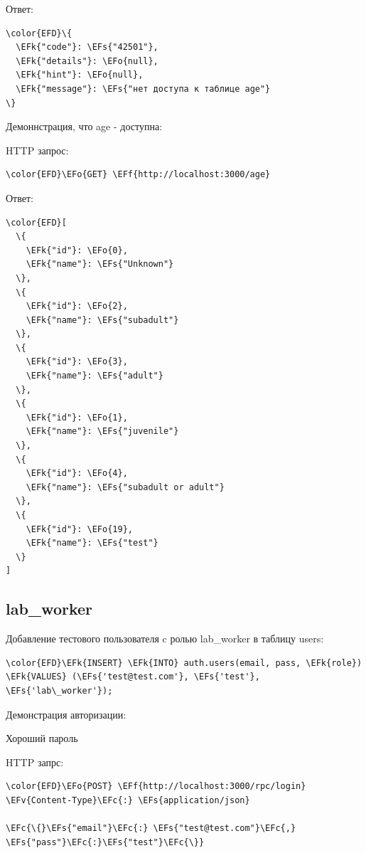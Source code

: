 \documentclass[14pt]{extarticle}
\newcommand{\EFc}[1]{\textcolor{EFc}{#1}} %
\newcommand{\EFs}[1]{\textcolor{EFs}{#1}} %
\newcommand{\EFk}[1]{\textcolor{EFk}{#1}} %
\newcommand{\EFf}[1]{\textcolor{EFf}{#1}} %
\newcommand{\EFv}[1]{\textcolor{EFv}{#1}} %
\newcommand{\EFo}[1]{\textcolor{EFo}{#1}} %
\begin{document}
Ответ:
\begin{Code}
\begin{Verbatim}
\color{EFD}\{
  \EFk{"code"}: \EFs{"42501"},
  \EFk{"details"}: \EFo{null},
  \EFk{"hint"}: \EFo{null},
  \EFk{"message"}: \EFs{"нет доступа к таблице age"}
\}
\end{Verbatim}
\end{Code}


Демоннстрация, что age - доступна:

HTTP запрос:
\begin{Code}
\begin{Verbatim}
\color{EFD}\EFo{GET} \EFf{http://localhost:3000/age}
\end{Verbatim}
\end{Code}


Ответ:
\begin{Code}
\begin{Verbatim}
\color{EFD}[
  \{
    \EFk{"id"}: \EFo{0},
    \EFk{"name"}: \EFs{"Unknown"}
  \},
  \{
    \EFk{"id"}: \EFo{2},
    \EFk{"name"}: \EFs{"subadult"}
  \},
  \{
    \EFk{"id"}: \EFo{3},
    \EFk{"name"}: \EFs{"adult"}
  \},
  \{
    \EFk{"id"}: \EFo{1},
    \EFk{"name"}: \EFs{"juvenile"}
  \},
  \{
    \EFk{"id"}: \EFo{4},
    \EFk{"name"}: \EFs{"subadult or adult"}
  \},
  \{
    \EFk{"id"}: \EFo{19},
    \EFk{"name"}: \EFs{"test"}
  \}
]
\end{Verbatim}
\end{Code}


\subsection{lab\_​worker}
\label{sec:org7bc2f68}

Добавление тестового пользователя c ролью lab\_​worker в таблицу users:
\begin{Code}
\begin{Verbatim}
\color{EFD}\EFk{INSERT} \EFk{INTO} auth.users(email, pass, \EFk{role}) \EFk{VALUES} (\EFs{'test@test.com'}, \EFs{'test'}, \EFs{'lab\_worker'});
\end{Verbatim}
\end{Code}


Демонстрация авторизации:


Хороший пароль

HTTP запрс:
\begin{Code}
\begin{Verbatim}
\color{EFD}\EFo{POST} \EFf{http://localhost:3000/rpc/login}
\EFv{Content-Type}\EFc{:} \EFs{application/json}

\EFc{\{}\EFs{"email"}\EFc{:} \EFs{"test@test.com"}\EFc{,} \EFs{"pass"}\EFc{:}\EFs{"test"}\EFc{\}}
\end{Verbatim}
\end{Code}
\end{document}
